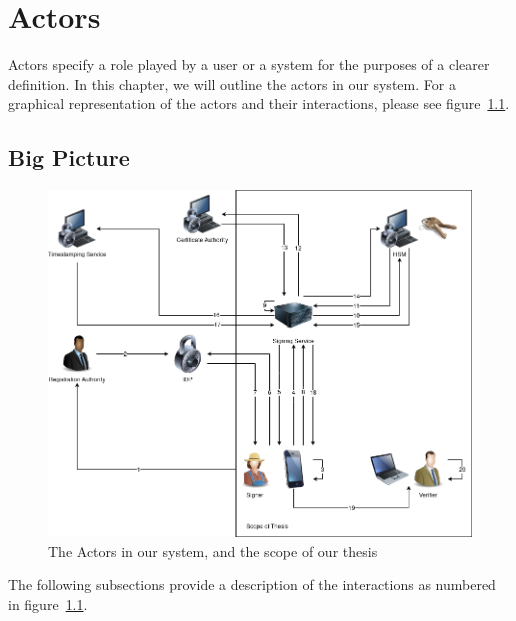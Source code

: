 \chapter{Actors}
\label{ch:actors}

Actors specify a role played by a user or a system for the purposes of a clearer definition.
In this chapter, we will outline the actors in our system.
For a graphical representation of the actors and their interactions, please see figure~\ref{fig:bigpicture}.

\section{Big Picture}\label{sec:big-picture}

\begin{landscape}
    \begin{figure}[H]
        \begin{center}
            \includegraphics[scale=0.55]{images/BigPicture.png}
            \caption{The Actors in our system, and the scope of our thesis}
            \label{fig:bigpicture}
        \end{center}
    \end{figure}
\end{landscape}

The following subsections provide a description of the interactions as numbered in figure~\ref{fig:bigpicture}.

